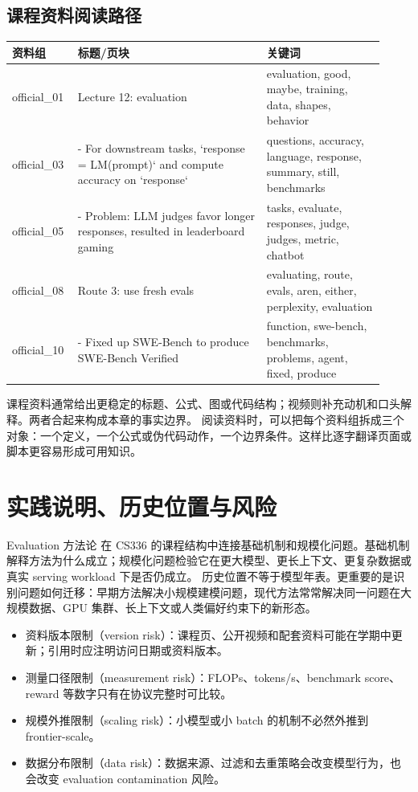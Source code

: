\documentclass[a4paper]{article}
\begin{document}
\subsection{课程资料阅读路径}
\begin{longtable}{p{0.14\linewidth}p{0.48\linewidth}p{0.30\linewidth}}
\toprule
\textbf{资料组} & \textbf{标题/页块} & \textbf{关键词}\\
\midrule
official\_01 & Lecture 12: evaluation & evaluation, good, maybe, training, data, shapes, behavior\\
official\_03 & - For downstream tasks, `response = LM(prompt)` and compute accuracy on `response` & questions, accuracy, language, response, summary, still, benchmarks\\
official\_05 & - Problem: LLM judges favor longer responses, resulted in leaderboard gaming & tasks, evaluate, responses, judge, judges, metric, chatbot\\
official\_08 & Route 3: use fresh evals & evaluating, route, evals, aren, either, perplexity, evaluation\\
official\_10 & - Fixed up SWE-Bench to produce SWE-Bench Verified & function, swe-bench, benchmarks, problems, agent, fixed, produce\\
\bottomrule
\end{longtable}
课程资料通常给出更稳定的标题、公式、图或代码结构；视频则补充动机和口头解释。两者合起来构成本章的事实边界。
阅读资料时，可以把每个资料组拆成三个对象：一个定义，一个公式或伪代码动作，一个边界条件。这样比逐字翻译页面或脚本更容易形成可用知识。
\section{实践说明、历史位置与风险}
Evaluation 方法论 在 CS336 的课程结构中连接基础机制和规模化问题。基础机制解释方法为什么成立；规模化问题检验它在更大模型、更长上下文、更复杂数据或真实 serving workload 下是否仍成立。
历史位置不等于模型年表。更重要的是识别问题如何迁移：早期方法解决小规模建模问题，现代方法常常解决同一问题在大规模数据、GPU 集群、长上下文或人类偏好约束下的新形态。
\begin{itemize}
\item 资料版本限制（version risk）：课程页、公开视频和配套资料可能在学期中更新；引用时应注明访问日期或资料版本。
\item 测量口径限制（measurement risk）：FLOPs、tokens/s、benchmark score、reward 等数字只有在协议完整时可比较。
\item 规模外推限制（scaling risk）：小模型或小 batch 的机制不必然外推到 frontier-scale。
\item 数据分布限制（data risk）：数据来源、过滤和去重策略会改变模型行为，也会改变 evaluation contamination 风险。
\end{itemize}
\end{document}
